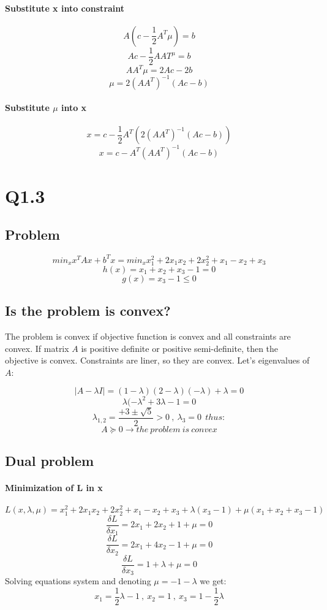 \documentclass[12pt]{article}
\begin{document}
\paragraph{Substitute x into constraint}
\[A(c- \frac{1}{2} A^T \mu) = b\]
\[Ac - \frac{1}{2} AAT^ \mu = b\]
\[AA^T \mu = 2Ac - 2b\]
\[\mu = 2 (AA^T)^{-1} (Ac - b)\]
\paragraph{Substitute $\mu$ into x}
\[x = c - \frac{1}{2} A^T ( 2 ( AA^T )^{-1} ( Ac - b ) ) \] 
\[x = c -  A^T (AA^T)^{-1} (Ac - b)\]  

\newpage
\section{Q1.3}
\subsection{Problem}
\[min_x x^T A x + b^T x = min_x x_1 ^2 + 2 x_1 x_2 + 2 x_2 ^2 + x_1 - x_2 + x_3 \]
\[h(x)= x_1 + x_2 + x_3 - 1 = 0\]
\[g(x)= x_3 - 1 \leq 0 \]
\subsection{Is the problem is convex?}
The problem is convex if objective function is convex and all constraints are convex. If matrix $A$ is positive definite or positive semi-definite, then the objective is convex. Constraints are liner, so they are convex. Let's eigenvalues of $A$:

\[|A- \lambda I | = (1- \lambda)(2 -\lambda)(-\lambda)+ \lambda = 0 \]
\[\lambda (- \lambda ^2 + 3 \lambda - 1  = 0\]
\[\lambda_{1,2} = \frac{+3 \pm \sqrt{5}}{2} > 0 \ , \ \lambda_3 = 0 \ \ thus: \]
\[A \succeq 0 \longrightarrow the \ problem \ is \ convex \]

\subsection{Dual problem}
\paragraph{Minimization of L in x}
\[L(x, \lambda, \mu) = x_1 ^2 + 2 x_1 x_2 + 2 x_2 ^2 + x_1 - x_2 + x_3 + \lambda (x_3 - 1) + \mu (x_1 + x_2 + x_3 - 1)\]
\[\frac{\delta L}{\delta x_1} = 2x_1 + 2x_2 + 1 + \mu = 0 \]
\[\frac{\delta L}{\delta x_2} = 2x_1 + 4x_2 - 1 + \mu = 0 \]
\[\frac{\delta L}{\delta x_3} = 1 + \lambda + \mu = 0\]
Solving equations system and denoting $\mu = -1 -\lambda$ we get:
\[x_1 = \frac{1}{2} \lambda -1 \ , \ x_2 =1 \ , \ x_3 = 1 - \frac{1}{2} \lambda\]
\end{document}

